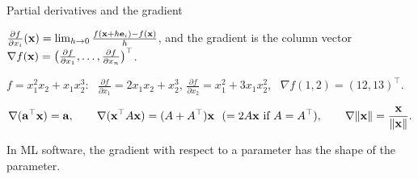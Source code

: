 \documentclass[aspectratio=1610,11pt]{beamer}
\begin{document}

\begin{frame}{Partial derivatives and the gradient}
    \begin{definition}
        \small $\frac{\partial f}{\partial x_i}(\mathbf{x}) = \lim_{h \to 0}\frac{f(\mathbf{x} + h\mathbf{e}_i) - f(\mathbf{x})}{h}$, and the gradient is the column vector $\nabla f(\mathbf{x}) = \big(\frac{\partial f}{\partial x_1}, \ldots, \frac{\partial f}{\partial x_n}\big)^\top$.
    \end{definition}
    \begin{example}[][ex:partials]
        \small $f = x_1^2x_2 + x_1x_2^3$: \ $\frac{\partial f}{\partial x_1} = 2x_1x_2 + x_2^3$, $\frac{\partial f}{\partial x_2} = x_1^2 + 3x_1x_2^2$, \ $\nabla f(1, 2) = (12, 13)^\top$.
    \end{example}
    \begin{proposition}
        \small
        \[\nabla(\mathbf{a}^\top\mathbf{x}) = \mathbf{a}, \qquad \nabla(\mathbf{x}^\top A\mathbf{x}) = (A + A^\top)\mathbf{x} \ \ (= 2A\mathbf{x} \text{ if } A = A^\top), \qquad \nabla\lVert \mathbf{x} \rVert = \frac{\mathbf{x}}{\lVert \mathbf{x} \rVert}.\]
    \end{proposition}
    \small In ML software, the gradient with respect to a parameter has the shape of the parameter.
\end{frame}

\end{document}
